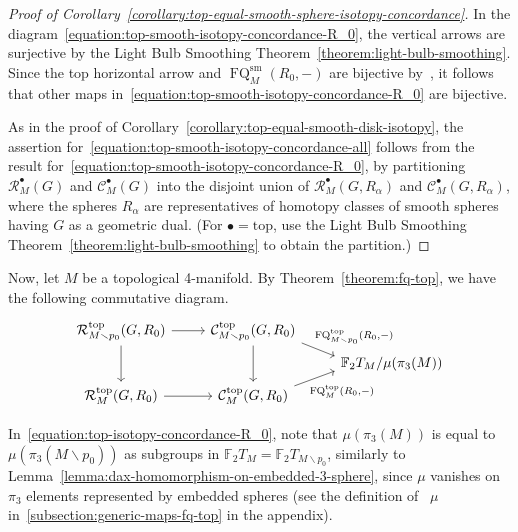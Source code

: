 \documentclass[11pt]{amsart}
\theoremstyle{definition}
\theoremstyle{theorem-giventitle}
\theoremstyle{definition-giventitle}
\numberwithin{equation}{section}
\def\cC{\mathcal{C}}
\def\cR{\mathcal{R}}
\def\bF{{\mathbb{F}}}
\def\sm{\mathrm{sm}}
\def\top{\mathrm{top}}
\def\FQ{\operatorname{FQ}}
\def\setminus{\smallsetminus}
\begin{document}
\begin{proof}[Proof of Corollary~\ref{corollary:top-equal-smooth-sphere-isotopy-concordance}]
  In the diagram~\eqref{equation:top-smooth-isotopy-concordance-R_0}, the vertical arrows are surjective by the Light Bulb Smoothing Theorem~\ref{theorem:light-bulb-smoothing}\@.
  Since the top horizontal arrow and $\FQ^\sm_M(R_0,-)$ are bijective by~\cite{Schneiderman-Teichner:2022-1}, it follows that other maps in~\eqref{equation:top-smooth-isotopy-concordance-R_0} are bijective.

  As in the proof of Corollary~\ref{corollary:top-equal-smooth-disk-isotopy}, the assertion for~\eqref{equation:top-smooth-isotopy-concordance-all} follows from the result for~\eqref{equation:top-smooth-isotopy-concordance-R_0}, by partitioning $\cR^\bullet_M(G)$ and $\cC^\bullet_M(G)$ into the disjoint union of $\cR^\bullet_M(G,R_\alpha)$ and $\cC^\bullet_M(G,R_\alpha)$, where the spheres $R_\alpha$ are representatives of homotopy classes of smooth spheres having $G$ as a geometric dual.
  (For $\bullet=\top$, use the Light Bulb Smoothing Theorem~\ref{theorem:light-bulb-smoothing} to obtain the partition.)
\end{proof}

Now, let $M$ be a topological 4-manifold.
By Theorem~\ref{theorem:fq-top}, we have the following commutative diagram.
\begin{equation}
  \begin{tikzcd}[row sep=tiny]
    \cR^\top_{M\setminus p_0}(G,R_0) \ar[r] \ar[dd]
    & \cC^\top_{M\setminus p_0}(G,R_0)
      \ar[dd] \ar[rd,"{\FQ^\top_{M\setminus p_0}(R_0,-)}",end anchor={[yshift=-.8ex]north west},pos=.3]
    \\
    & & \bF_2 T_M / \mu(\pi_3(M))
    \\
    \cR^\top_M(G,R_0) \ar[r] 
    & \cC^\top_M(G,R_0) \ar[ru,"{\FQ^\top_M(R_0,-)}"',end anchor={[yshift=.8ex]south west},pos=.3]
  \end{tikzcd}
  \label{equation:top-isotopy-concordance-R_0}
\end{equation}

In~\eqref{equation:top-isotopy-concordance-R_0}, note that $\mu(\pi_3(M))$ is equal to $\mu(\pi_3(M\setminus p_0))$ as subgroups in $\bF_2 T_M = \bF_2 T_{M\setminus p_0}$, similarly to Lemma~\ref{lemma:dax-homomorphism-on-embedded-3-sphere}, since $\mu$ vanishes on $\pi_3$ elements represented by embedded spheres (see the definition of ~$\mu$ in~\ref{subsection:generic-maps-fq-top} in the appendix).
\end{document}

